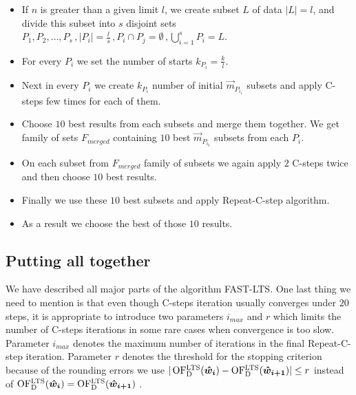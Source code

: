 \begin{itemize}
    \item If $n$ is greater than a given limit $l$, we create subset $L$ of data $|L| = l$, and divide this subset into $s$ disjoint sets $P_1, P_2,\ldots,P_s\,, |P_i| = \frac{l}{s}\,, P_i\cap P_j  = \emptyset\,, \bigcup_{i=1}^{s} P_{i} = L$.
    \item For every $P_i$ we set the number of starts $k_{P_i} = \frac{k}{l}$. 
    \item Next in every $P_i$ we create $k_{P_i}$ number of initial $\vec{m}_{P_{i_1}}$ subsets and apply C-steps few times for each of them.
    \item Choose $10$ best results from each subsets and merge them together. We get family of sets
    $F_{merged}$ containing $10$ best $\vec{m}_{P_{i_3}}$ subsets from each $P_i$.
    \item On each subset from  $F_{merged}$ family of subsets we again apply $2$ C-steps twice and then choose $10$ best results.
    \item Finally we use these $10$ best subsets and apply Repeat-C-step algorithm.
    \item As a result we choose the best of those $10$ results.
\end{itemize} 


\subsection{Putting all together}
We have described all major parts of the algorithm FAST-LTS. One last thing we need to mention is that even though C-steps iteration usually converges under $20$ steps, it is appropriate to introduce two parameters 
$i_{max}$ and $r$ which limits the number of C-steps iterations in some rare cases when convergence is too slow. Parameter $i_{max}$ denotes the maximum number of iterations in the final Repeat-C-step iteration. Parameter $r$ denotes the threshold for the stopping criterion because of the rounding errors we use $| \operatorname{OF^{LTS}_D}(\boldsymbol{\hat{w}_{i}}) - \operatorname{OF^{LTS}_D}(\boldsymbol{\hat{w}_{i+1}})| \leq r$ instead of 
$\operatorname{OF^{LTS}_D}(\boldsymbol{\hat{w}_{i}}) = \operatorname{OF^{LTS}_D}(\boldsymbol{\hat{w}_{i+1}})$ .



